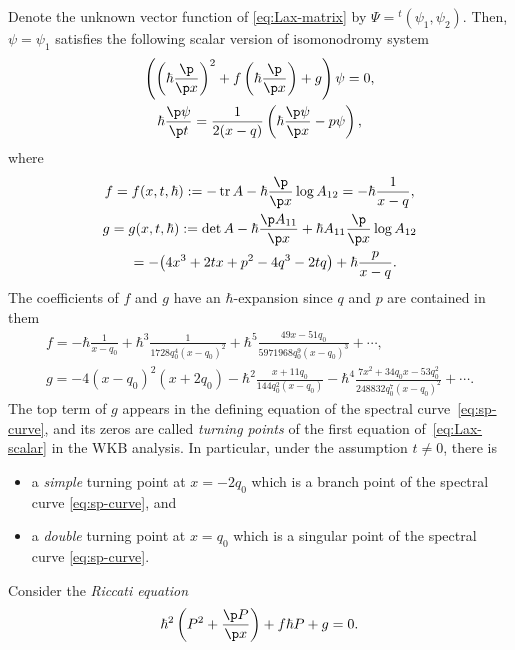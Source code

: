 Denote the unknown vector function of \eqref{eq:Lax-matrix}
by $\Psi = {}^t(\psi_1, \psi_2)$.
Then, $\psi = \psi_1$ satisf\/ies the
following scalar version of isomonodromy system
\begin{gather}
\left( \left(\hbar\frac{\p}{\p x}\right)^{2} +
f \left(\hbar\frac{\p}{\p x}\right) + g \right)\psi = 0, \nonumber\\
\hbar \frac{\p \psi}{\p t} = \frac{1}{2(x-q)} \left(
\hbar \frac{\p \psi}{\p x} - p \psi \right),\label{eq:Lax-scalar}
\end{gather}
where
\begin{gather*}
f = f(x,t,\hbar)   :=   -\operatorname{tr} A - \hbar \frac{\p}{\p x}\log A_{12}
= -\hbar \frac{1}{x-q},  \\
g = g(x,t,\hbar)   :=   \det A - \hbar \frac{\p A_{11}}{\p x} +
\hbar A_{11} \frac{\p}{\p x}\log A_{12}   \\
\hphantom{g}{}
  =
- \big(4x^{3} + 2tx + p^{2} - 4q^{3} - 2tq\big) + \hbar \frac{p}{x-q}.
\end{gather*}
The coef\/f\/icients of $f$ and $g$ have an $\hbar$-expansion since
$q$ and $p$ are contained in them
\begin{gather} \label{eq:hbar-correction-in-quantization}
f   =   - \hbar  \frac{1}{x-q_{0}}
 +\hbar^{3} \frac{1}{1728q_{0}^{4}(x-q_{0})^{2}} + \hbar^{5}
 \frac{49x-51q_{0}}{5971968q_{0}^{9}(x-q_{0})^{3}} + \cdots,
\\  \label{eq:hbar-correction-in-quantization2}
g   =   -4(x-q_{0})^{2}(x+2q_{0})
 - \hbar^{2} \frac{x+11q_{0}}{144q_{0}^{2}(x-q_{0})}
 - \hbar^{4} \frac{7x^{2}+34q_{0}x-53q_{0}^{2}}
  {248832q_{0}^{7}(x-q_{0})^{2}}+\cdots .
\end{gather}
The top term of $g$ appears in the def\/ining equation of
the spectral cur\-ve~\eqref{eq:sp-curve},
and its zeros are called {\em turning points}
of the f\/irst equation of~\eqref{eq:Lax-scalar}
in the WKB analysis.
In particular, under the assumption $t \ne 0$, there is
\begin{itemize}\itemsep=0pt
\item
a {\em simple} turning point at $x=-2q_{0}$
which is a branch point
of the spectral curve \eqref{eq:sp-curve}, and
\item
a {\em double} turning point at $x = q_{0}$
which is a singular point of
the spectral curve \eqref{eq:sp-curve}.
\end{itemize}
Consider the {\em Riccati equation}
\begin{gather} \label{eq:Riccati}
\hbar^{2} \left( P^{2} + \frac{\p P}{\p x} \right)
+ f \hbar P + g = 0.
\end{gather}
